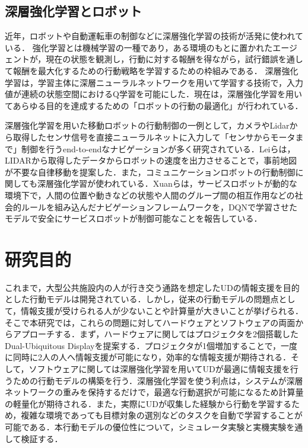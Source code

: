 \documentclass[12pt]{sonota/aislab}
\begin{document}
\subsection{深層強化学習とロボット}
近年，ロボットや自動運転車の制御などに深層強化学習の技術が活発に使われている．
強化学習とは機械学習の一種であり，ある環境のもとに置かれたエージェントが，現在の状態を観測し，行動に対する報酬を得ながら，試行錯誤を通して報酬を最大化するための行動戦略を学習するための枠組みである\cite{RL}．
深層強化学習は，学習主体に深層ニューラルネットワークを用いて学習する技術で，入力値が連続の状態空間におけるQ学習を可能にした\cite{drl}．現在は，深層強化学習を用いてあらゆる目的を達成するための「ロボットの行動の最適化」が行われている\cite{Human_level_dqn}\cite{sarl}．

深層強化学習を用いた移動ロボットの行動制御の一例として，カメラやLidarから取得したセンサ信号を直接ニューラルネットに入力して「センサからモータまで」制御を行うend-to-endなナビゲーションが多く研究されている\cite{ete}\cite{Self}\cite{vtr}．Leiらは，LIDARから取得したデータからロボットの速度を出力させることで，事前地図が不要な自律移動を提案した\cite{vtr}．また，コミュニケーションロボットの行動制御に関しても深層強化学習が使われている．Xuanらは，サービスロボットが動的な環境下で，人間の位置や動きなどの状態や人間のグループ間の相互作用などの社会的ルールを組み込んだナビゲーションフレームワーク\cite{human_navigation}を，DQNで学習させたモデルで安全にサービスロボットが制御可能なことを報告している\cite{human_navigation_dqn}．

\section{研究目的}
これまで，大型公共施設内の人が行き交う通路を想定したUDの情報支援を目的とした行動モデルは開発されている．しかし，従来の行動モデルの問題点として，情報支援が受けられる人が少ないことや計算量が大きいことが挙げられる．そこで本研究では，これらの問題に対してハードウェアとソフトウェアの両面からアプローチする．まず，ハードウェアに関してはプロジェクタを2個搭載したDual-Ubiquitous Displayを提案する．プロジェクタが1個増加することで，一度に同時に2人の人へ情報支援が可能になり，効率的な情報支援が期待される．そして，ソフトウェアに関しては深層強化学習を用いてUDが最適に情報支援を行うための行動モデルの構築を行う．深層強化学習を使う利点は，システムが深層ネットワークの重みを保持するだけで，最適な行動選択が可能になるため計算量の軽量化が期待される．また，実際にUDが収集した経験から行動を学習するため，複雑な環境であっても目標対象の選別などのタスクを自動で学習することが可能である．本行動モデルの優位性について，シミュレータ実験と実機実験を通して検証する．
\end{document}
